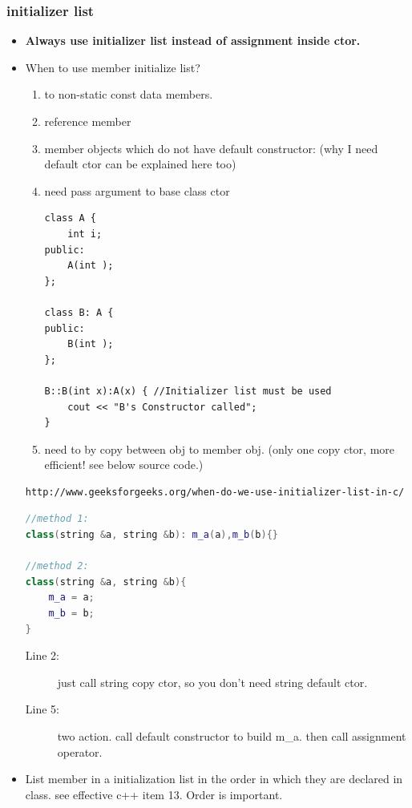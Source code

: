\documentclass[a4paper,11pt,twoside]{book}
\begin{document}
\subsubsection{initializer list}
\begin{itemize}
\item \textbf{Always use initializer list instead of assignment inside ctor.}

\item When to use member initialize list?
\begin{enumerate}
\item to non-static const data members.
\item reference member
\item  member objects which do not have default constructor: (why I need default ctor can be explained here too)
\item need pass argument to base class ctor
\begin{lstlisting}[numbers=none]
class A {
    int i;
public:
    A(int );
};

class B: A {
public:
    B(int );
};

B::B(int x):A(x) { //Initializer list must be used
    cout << "B's Constructor called";
}
\end{lstlisting}

\item need to by copy between obj to member obj. (only one copy ctor, more efficient! see below source code.)
\end{enumerate}

\begin{verbatim}
http://www.geeksforgeeks.org/when-do-we-use-initializer-list-in-c/
\end{verbatim}

\begin{lstlisting}[frame=single, language=c++]
//method 1:
class(string &a, string &b): m_a(a),m_b(b){}

//method 2:
class(string &a, string &b){   
	m_a = a;  
	m_b = b; 
}
\end{lstlisting}
\begin{description}
	\item[Line 2:] just call string copy ctor, so you don't need string default ctor.
	\item[Line 5:] two action. call default constructor to build m\_a. then call assignment operator.
\end{description}

\item List member in a initialization list in the order in which they are declared in class. see effective c++ item 13. Order is important.


\end{itemize}
\end{document}
